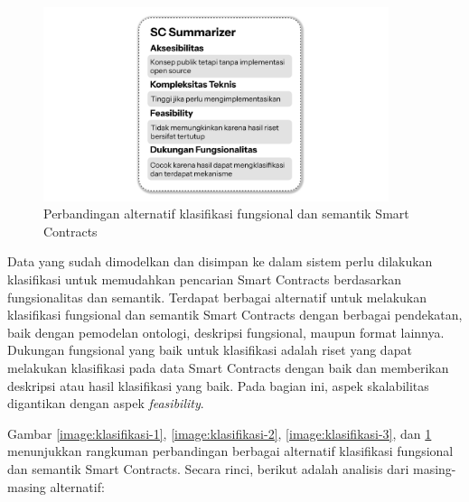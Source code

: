 \begin{figure}[ht]
	\centering
	\includegraphics[width=0.9\textwidth]{resources/chapter-3/klasifikasi - 4.png}
	\caption{Perbandingan alternatif klasifikasi fungsional dan semantik Smart Contracts}
	\label{image:klasifikasi-4}
\end{figure}

Data yang sudah dimodelkan dan disimpan ke dalam sistem perlu dilakukan klasifikasi untuk memudahkan pencarian Smart Contracts berdasarkan fungsionalitas dan semantik. Terdapat berbagai alternatif untuk melakukan klasifikasi fungsional dan semantik Smart Contracts dengan berbagai pendekatan, baik dengan pemodelan ontologi, deskripsi fungsional, maupun format lainnya. Dukungan fungsional yang baik untuk klasifikasi adalah riset yang dapat melakukan klasifikasi pada data Smart Contracts dengan baik dan memberikan deskripsi atau hasil klasifikasi yang baik. Pada bagian ini, aspek skalabilitas digantikan dengan aspek \textit{feasibility}.

Gambar \ref{image:klasifikasi-1}, \ref{image:klasifikasi-2}, \ref{image:klasifikasi-3}, dan \ref{image:klasifikasi-4} menunjukkan rangkuman perbandingan berbagai alternatif klasifikasi fungsional dan semantik Smart Contracts. Secara rinci, berikut adalah analisis dari masing-masing alternatif:

